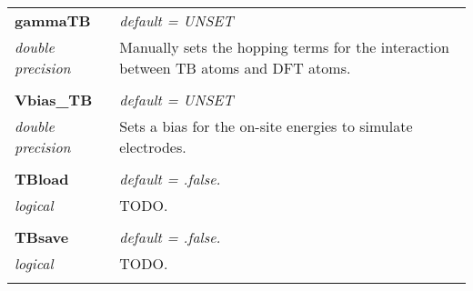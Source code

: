 \begin{Spacing}{1.0}
\begin{longtable}{ p{} p{} }
   \textbf{gammaTB}
   &  \textit{default = UNSET}
   \\*\textit{double precision}
   & Manually sets the hopping terms for the interaction
   between TB atoms and DFT atoms.\\* \\

   \textbf{Vbias\_TB}
   &  \textit{default = UNSET}
   \\*\textit{double precision}
   & Sets a bias for the on-site energies to simulate
   electrodes.\\* \\

   \textbf{TBload}
   &  \textit{default = .false. }
   \\*\textit{logical}
   & TODO.\\* \\

   \textbf{TBsave}
   &  \textit{default = .false. }
   \\*\textit{logical}
   & TODO.\\* \\

\end{longtable}
\end{Spacing}
